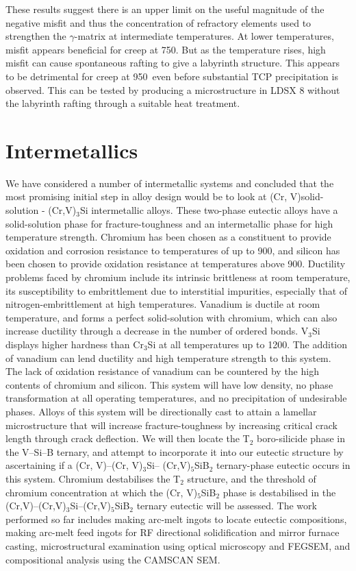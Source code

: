 These results suggest there is an upper limit on the useful magnitude of the negative misfit and thus the concentration of refractory elements used to strengthen the $\gamma$-matrix at intermediate temperatures. At lower temperatures, misfit appears beneficial for creep at 750\celsius. But as the temperature rises, high misfit can cause spontaneous rafting to give a labyrinth structure. This appears to be detrimental for creep at 950\celsius\ even before substantial TCP precipitation is observed. This can be tested by producing a microstructure in LDSX 8 without the labyrinth rafting through a suitable heat treatment.\section{Intermetallics}We have considered a number of intermetallic systems and concluded that the most promising initial step in alloy design would be to look at (Cr, V)solid-solution - (Cr,V)$_3$Si intermetallic alloys. These two-phase eutectic alloys have a solid-solution phase for fracture-toughness and an intermetallic phase for high temperature strength. Chromium has been chosen as a constituent to provide oxidation and corrosion resistance to temperatures of up to 900\celsius, and silicon has been chosen to provide oxidation resistance at temperatures above 900\celsius. Ductility problems faced by chromium include its intrinsic brittleness at room temperature, its susceptibility to embrittlement due to interstitial impurities, especially that of nitrogen-embrittlement at high temperatures. Vanadium is ductile at room temperature, and forms a perfect solid-solution with chromium, which can also increase ductility through a decrease in the number of ordered bonds. V$_3$Si displays higher hardness than Cr$_3$Si at all temperatures up to 1200\celsius. The addition of vanadium can lend ductility and high temperature strength to this system. The lack of oxidation resistance of vanadium can be countered by the high contents of chromium and silicon. This system will have low density, no phase transformation at all operating temperatures, and no precipitation of undesirable phases. 
Alloys of this system will be directionally cast to attain a lamellar microstructure that will increase fracture-toughness by increasing critical crack length through crack deflection. We will then locate the T$_2$ boro-silicide phase in the V--Si--B ternary, and attempt to incorporate it into our eutectic structure by ascertaining if a (Cr, V)--(Cr, V)$_3$Si-- (Cr,V)$_5$SiB$_2$ ternary-phase eutectic occurs in this system. Chromium destabilises the T$_2$ structure, and the threshold of chromium concentration at which the (Cr, V)$_5$SiB$_2$ phase is destabilised in the (Cr,V)--(Cr,V)$_3$Si--(Cr,V)$_5$SiB$_2$ ternary eutectic will be assessed.
The work performed so far includes making arc-melt ingots to locate eutectic compositions, making arc-melt feed ingots for RF directional solidification and mirror furnace casting, microstructural examination using optical microscopy and FEGSEM, and compositional analysis using the CAMSCAN SEM. 